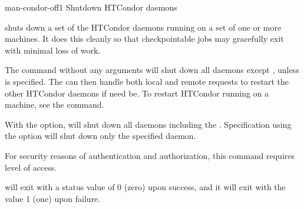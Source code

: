 \begin{ManPage}{}{man-condor-off}{1}
{Shutdown HTCondor daemons}

\Synopsis {}
\ToolArgsBase

\ToolDebugOption
\ToolWhere
\ToolArgsAffect

\Description 

 shuts down a set of the HTCondor daemons running on a set of
one or more machines.
It does this cleanly so that checkpointable jobs may gracefully exit with
minimal loss of work.

The command  without any arguments will shut down
all daemons except , unless  is
specified.
The  can then handle both local and remote
requests to restart the other HTCondor daemons if need be.  To restart
HTCondor running on a machine, see the  command.

With the  option,  will shut down
all daemons including the .
Specification using the  option
will shut down
only the specified daemon.

For security reasons of authentication and authorization,
this command requires  level of access.

\begin{Options}
	\ToolArgsBaseDesc
	\ToolDebugDesc
	\ToolArgsLocateDesc
	\ToolArgsAffectDesc
\end{Options}

\ExitStatus
{} will exit with a status value of 0 (zero) upon success,
and it will exit with the value 1 (one) upon failure.



\end{ManPage}
